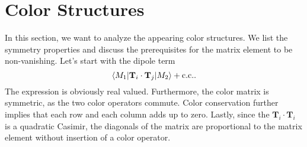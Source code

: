 \documentclass[a4paper,11pt]{article}
\begin{document}
\section{Color Structures}
In this section, we want to analyze the appearing color structures. We list the symmetry properties and discuss the prerequisites for the matrix element to be non-vanishing. Let's start with the dipole term
\begin{equation}
\braket{M_1|\mathbf{T}_i \cdot \mathbf{T}_j|M_2} + \text{c.c.}.
\end{equation}
The expression is obviously real valued. Furthermore, the color matrix is symmetric, as the two color operators commute. Color conservation further implies that each row and each column adds up to zero. Lastly, since the $\mathbf{T}_i \cdot \mathbf{T}_i$ is a quadratic Casimir, the diagonals of the matrix are proportional to the matrix element without insertion of a color operator.
\end{document}
